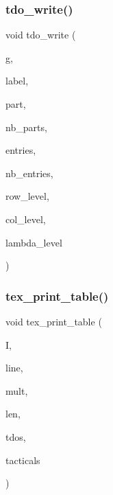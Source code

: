 \mbox{\label{tdo__refine__all_8_c_aab667cbb1bb3e5e2eea359bee495c9df}} 
\subsubsection{\texorpdfstring{tdo\+\_\+write()}{tdo\_write()}}
{\footnotesize\ttfamily void tdo\+\_\+write (\begin{DoxyParamCaption}\item[{ofstream \&}]{g,  }\item[{\mbox{\hyperlink{galois_8h_ab6cc7b4aeb6ea31aba2b3fbfc83ff5e6}{B\+Y\+TE}} $\ast$}]{label,  }\item[{int $\ast$}]{part,  }\item[{int}]{nb\+\_\+parts,  }\item[{int $\ast$}]{entries,  }\item[{int}]{nb\+\_\+entries,  }\item[{\mbox{\hyperlink{galois_8h_a09fddde158a3a20bd2dcadb609de11dc}{I\+NT}}}]{row\+\_\+level,  }\item[{\mbox{\hyperlink{galois_8h_a09fddde158a3a20bd2dcadb609de11dc}{I\+NT}}}]{col\+\_\+level,  }\item[{\mbox{\hyperlink{galois_8h_a09fddde158a3a20bd2dcadb609de11dc}{I\+NT}}}]{lambda\+\_\+level }\end{DoxyParamCaption})}

\mbox{\label{tdo__refine__all_8_c_ab9daab59537326d47c7f3265550c2890}} 
\subsubsection{\texorpdfstring{tex\+\_\+print\+\_\+table()}{tex\_print\_table()}}
{\footnotesize\ttfamily void tex\+\_\+print\+\_\+table (\begin{DoxyParamCaption}\item[{int}]{I,  }\item[{int $\ast$}]{line,  }\item[{int $\ast$}]{mult,  }\item[{int}]{len,  }\item[{int}]{tdos,  }\item[{int}]{tacticals }\end{DoxyParamCaption})}




